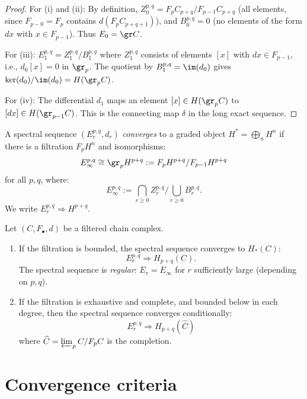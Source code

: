 \begin{proof}
For (i) and (ii): By definition, $Z_0^{p,q} = F_p C_{p+q} / F_{p-1} C_{p+q}$
(all elements, since $F_{p-0} = F_p$ contains $d(F_p C_{p+q+1})$), and
$B_0^{p,q} = 0$ (no elements of the form $dx$ with $x \in F_{p-1}$). Thus
$E_0 = \gr C$.

For (iii): $E_1^{p,q} = Z_1^{p,q} / B_1^{p,q}$ where $Z_1^{p,q}$ consists of
elements $[x]$ with $dx \in F_{p-1}$, i.e., $d_0[x] = 0$ in $\gr_p$. The
quotient by $B_1^{p,q} = \im(d_0)$ gives $\ker(d_0)/\im(d_0) = H(\gr_p C)$.

For (iv): The differential $d_1$ maps an element $[x] \in H(\gr_p C)$ to $[dx]
\in H(\gr_{p-1} C)$. This is the connecting map $\delta$ in the
long exact sequence.
\end{proof}

\begin{definition}[Convergence]
\label{def:ss-convergence}
A spectral sequence $(E_r^{p,q}, d_r)$ \emph{converges} to a graded object
$H^* = \bigoplus_n H^n$ if there is a filtration $F_p H^n$ and isomorphisms:
\[
E_\infty^{p,q} \cong \gr_p H^{p+q} := F_p H^{p+q} / F_{p-1} H^{p+q}
\]
for all $p, q$, where:
\[
E_\infty^{p,q} := \bigcap_{r \geq 0} Z_r^{p,q} / \bigcup_{r \geq 0} B_r^{p,q}.
\]
We write $E_r^{p,q} \Rightarrow H^{p+q}$.
\end{definition}

\begin{theorem}
\label{thm:classical-convergence}
Let $(C, F_\bullet, d)$ be a filtered chain complex.
\begin{enumerate}[label=(\roman*)]
\item If the filtration is bounded, the spectral sequence converges to $H_*(C)$:
\[
E_r^{p,q} \Rightarrow H_{p+q}(C).
\]
The spectral sequence is \emph{regular}: $E_r = E_\infty$ for
$r$ sufficiently large (depending on $p, q$).

\item If the filtration is exhaustive and complete, and bounded below in each
degree, then the spectral sequence converges conditionally:
\[
E_r^{p,q} \Rightarrow H_{p+q}(\widehat{C})
\]
where $\widehat{C} = \varprojlim_p C / F_p C$ is the completion.
\end{enumerate}
\end{theorem}


\section{Convergence criteria}
\label{sec:convergence-criteria}


